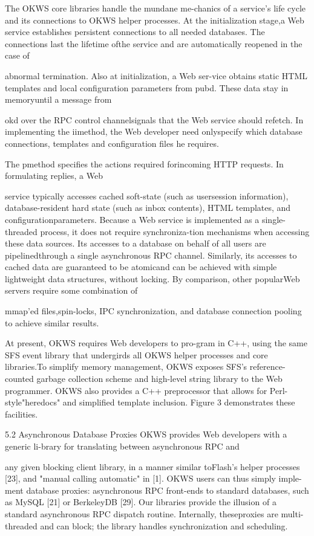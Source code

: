 The OKWS core libraries handle the mundane me-chanics of a service's life cycle and its connections to
OKWS helper processes. At the initialization stage,a Web service establishes persistent connections to all
needed databases. The connections last the lifetime ofthe service and are automatically reopened in the case of

abnormal termination. Also at initialization, a Web ser-vice obtains static HTML templates and local configuration parameters from pubd. These data stay in memoryuntil a message from

okd over the RPC control channelsignals that the Web service should refetch. In implementing the i\Gamma i\Delta  method, the Web developer need onlyspecify which database connections, templates and configuration files he requires.

The p\Theta \Lambda \Xi \Pi \Sigma \Sigma  method specifies the actions required forincoming HTTP requests. In formulating replies, a Web

service typically accesses cached soft-state (such as usersession information), database-resident hard state (such
as inbox contents), HTML templates, and configurationparameters. Because a Web service is implemented as a
single-threaded process, it does not require synchroniza-tion mechanisms when accessing these data sources. Its
accesses to a database on behalf of all users are pipelinedthrough a single asynchronous RPC channel. Similarly,
its accesses to cached data are guaranteed to be atomicand can be achieved with simple lightweight data structures, without locking. By comparison, other popularWeb servers require some combination of

mmap'ed files,spin-locks, IPC synchronization, and database connection pooling to achieve similar results.

At present, OKWS requires Web developers to pro-gram in C++, using the same SFS event library that undergirds all OKWS helper processes and core libraries.To simplify memory management, OKWS exposes SFS's
reference-counted garbage collection scheme and high-level string library to the Web programmer. OKWS also
provides a C++ preprocessor that allows for Perl-style"heredocs" and simplified template inclusion. Figure 3
demonstrates these facilities.

5.2 Asynchronous Database Proxies
OKWS provides Web developers with a generic li-brary for translating between asynchronous RPC and

any given blocking client library, in a manner similar toFlash's helper processes [23], and "manual calling automatic" in [1]. OKWS users can thus simply imple-ment database proxies: asynchronous RPC front-ends
to standard databases, such as MySQL [21] or BerkeleyDB [29]. Our libraries provide the illusion of a standard
asynchronous RPC dispatch routine. Internally, theseproxies are multi-threaded and can block; the library handles synchronization and scheduling.

